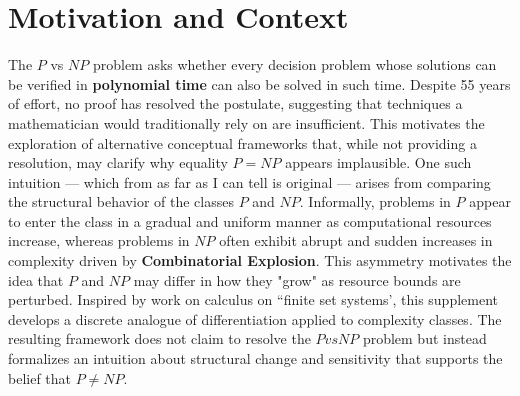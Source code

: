 \documentclass{article}
\begin{document}
\section{Motivation and Context}
The $P$ vs $NP$ problem asks whether every decision problem whose solutions can be verified in \textbf{polynomial time} can also be solved in  such time.
Despite 55 years of effort, no proof has resolved the postulate, suggesting that techniques a mathematician would traditionally rely on are insufficient.
This motivates the exploration of alternative conceptual frameworks that, while not providing a resolution, may clarify why equality $P = NP$ appears implausible.
One such intuition --- which from as far as I can tell is original --- arises from comparing the structural behavior of the classes $P$ and $NP$.
Informally, problems in $P$ appear to enter the class in a gradual and uniform manner as computational resources increase, whereas problems in $NP$ often exhibit abrupt and sudden increases in complexity driven by \textbf{Combinatorial Explosion}.
This asymmetry motivates the idea that $P$ and $NP$ may differ in how they "grow" as resource bounds are perturbed.
Inspired by work on calculus on “finite set systems', this supplement develops a discrete analogue of differentiation applied to complexity classes.
The resulting framework does not claim to resolve the $P vs NP$ problem but instead formalizes an intuition about structural change and sensitivity that supports the belief that $P \neq NP$.
\end{document}
